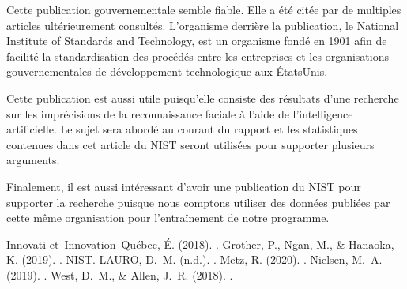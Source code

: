 \documentclass[letterpaper,10pt,french]{sphinxmanual}
\begin{document}
Cette publication gouvernementale semble fiable. Elle a été citée par de
multiples articles ultérieurement consultés. L’organisme derrière la
publication, le National Institute of Standards and Technology, est un organisme
fondé en 1901 afin de facilité la standardisation des procédés entre les
entreprises et les organisations gouvernementales de développement technologique
aux États\sphinxhyphen{}Unis.

Cette publication est aussi utile puisqu’elle consiste des résultats d’une
recherche sur les imprécisions de la reconnaissance faciale à l’aide de
l’intelligence artificielle. Le sujet sera abordé au courant du rapport et
les statistiques contenues dans cet article du NIST seront utilisées pour
supporter plusieurs arguments.

Finalement, il est aussi intéressant d’avoir une publication du NIST pour
supporter la recherche puisque nous comptons utiliser des données publiées
par cette même organisation pour l’entraînement de notre programme.



\begin{sphinxthebibliography}{Innovati}
et Innovation Québec, É. (2018). .
Grother, P., Ngan, M., \& Hanaoka, K. (2019). . NIST.
LAURO, D. M. (n.d.). .
Metz, R. (2020). .
Nielsen, M. A. (2019). .
West, D. M., \& Allen, J. R. (2018). .
\end{sphinxthebibliography}







\renewcommand{\indexname}{Index}
\printindex
\end{document}
